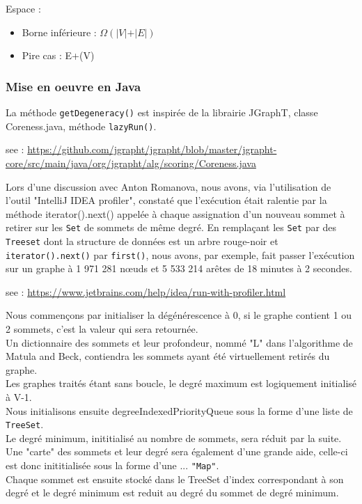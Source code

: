 Espace :
\begin{itemize}
    \item Borne inférieure :
    $\Omega{\displaystyle (\vert V\vert +\vert E\vert )}$

    \item Pire cas :
    {\vert E\vert +{}(\vert V\vert )}

\end{itemize}
\subsubsection{Mise en oeuvre en Java }
La méthode \texttt{getDegeneracy()} est inspirée de la librairie JGraphT, classe Coreness.java, méthode  \texttt{lazyRun()}.


see : \href{https://github.com/jgrapht/jgrapht/blob/master/jgrapht-core/src/main/java/org/jgrapht/alg/scoring/Coreness.java}{https://github.com/jgrapht/jgrapht/blob/master/jgrapht-core/src/main/java/org/jgrapht/alg/scoring/Coreness.java}

Lors d'une discussion avec Anton Romanova, nous avons, via l'utilisation de l'outil "IntelliJ IDEA profiler", constaté que l'exécution était ralentie par la méthode iterator().next() appelée à chaque assignation d'un nouveau sommet à retirer sur les \texttt{Set} de sommets de même degré.
En remplaçant les \texttt{Set} par des \texttt{Treeset} dont la structure de données est un arbre rouge-noir et \texttt{iterator().next()}  par \texttt{first()}, nous avons, par exemple, fait passer l'exécution sur un graphe à 1 971 281 nœuds et 5 533 214 arêtes de 18 minutes à 2 secondes.

see : \href{https://www.jetbrains.com/help/idea/run-with-profiler.html}{https://www.jetbrains.com/help/idea/run-with-profiler.html}

Nous commençons par initialiser la dégénérescence à 0, si le graphe contient 1 ou 2 sommets, c'est la valeur qui sera retournée. \\
Un dictionnaire des sommets et leur profondeur, nommé "L" dans l'algorithme de Matula and Beck, contiendra les sommets ayant été virtuellement retirés du graphe. \\
Les graphes traités étant sans boucle, le degré maximum est logiquement initialisé à V-1. \\
Nous initialisons ensuite degreeIndexedPriorityQueue sous la forme d'une liste de \texttt{TreeSet}. \\
Le degré minimum, inititialisé au nombre de sommets, sera réduit par la suite.
Une "carte" des sommets et leur degré sera également d'une grande aide, celle-ci est donc inititialisée sous la forme d'une ... \texttt{"Map"}. \\
Chaque sommet est ensuite stocké dans le TreeSet d'index correspondant à son degré et le degré minimum est reduit au degré du sommet de degré minimum.


